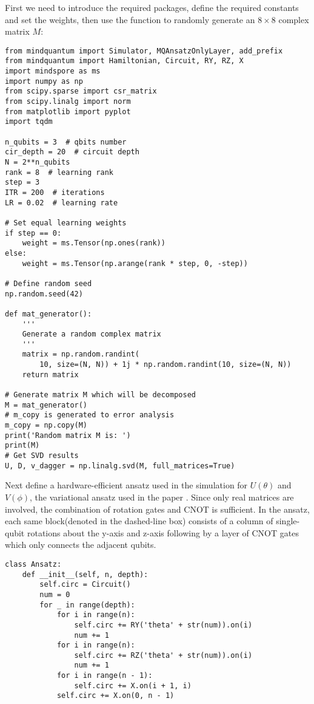 First we need to introduce the required packages, define the required constants and set the weights, then use the  function to randomly generate an $8 \times 8$ complex matrix $M$:
\begin{lstlisting}
from mindquantum import Simulator, MQAnsatzOnlyLayer, add_prefix
from mindquantum import Hamiltonian, Circuit, RY, RZ, X
import mindspore as ms
import numpy as np
from scipy.sparse import csr_matrix
from scipy.linalg import norm
from matplotlib import pyplot
import tqdm

n_qubits = 3  # qbits number
cir_depth = 20  # circuit depth
N = 2**n_qubits
rank = 8  # learning rank
step = 3
ITR = 200  # iterations
LR = 0.02  # learning rate

# Set equal learning weights
if step == 0:
    weight = ms.Tensor(np.ones(rank))
else:
    weight = ms.Tensor(np.arange(rank * step, 0, -step))

# Define random seed
np.random.seed(42)

def mat_generator():
    '''
    Generate a random complex matrix
    '''
    matrix = np.random.randint(
        10, size=(N, N)) + 1j * np.random.randint(10, size=(N, N))
    return matrix

# Generate matrix M which will be decomposed
M = mat_generator()
# m_copy is generated to error analysis
m_copy = np.copy(M)
print('Random matrix M is: ')
print(M)
# Get SVD results
U, D, v_dagger = np.linalg.svd(M, full_matrices=True)
\end{lstlisting}
Next define a hardware-efficient ansatz used in the simulation for $U(\theta)$ and $V(\phi)$, the variational ansatz used in the paper \cite{wang2021variational}. Since only real matrices are involved, the combination of rotation gates and CNOT is sufficient. In the ansatz, each same block(denoted in the dashed-line box) consists of a column of single-qubit rotations about the y-axis and z-axis following by a layer of CNOT gates which only connects the adjacent qubits.
\begin{lstlisting}
class Ansatz:
    def __init__(self, n, depth):
        self.circ = Circuit()
        num = 0
        for _ in range(depth):
            for i in range(n):
                self.circ += RY('theta' + str(num)).on(i)
                num += 1
            for i in range(n):
                self.circ += RZ('theta' + str(num)).on(i)
                num += 1
            for i in range(n - 1):
                self.circ += X.on(i + 1, i)
            self.circ += X.on(0, n - 1)
\end{lstlisting}
